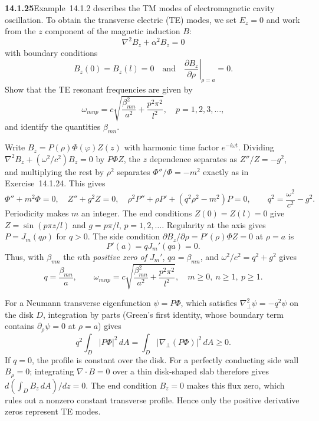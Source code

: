 \par\bigskip
\noindent\textbf{14.1.25}\quad Example~14.1.2 describes the TM modes of
electromagnetic cavity oscillation. To obtain the transverse electric
(TE) modes, we set $E_{z}=0$ and work from the $z$ component of the
magnetic induction $B$:
\[
\nabla^{2}B_{z}+\alpha^{2}B_{z}=0
\]
with boundary conditions
\[
B_{z}(0)=B_{z}(l)=0\quad\text{and}\quad
\left.\frac{\partial B_{z}}{\partial\rho}\right|_{\rho=a}=0.
\]
Show that the TE resonant frequencies are given by
\[
\omega_{mnp}=c\sqrt{\frac{\beta_{mn}^{2}}{a^{2}}+\frac{p^{2}\pi^{2}}{l^{2}}},
\quad p=1,2,3,\ldots,
\]
and identify the quantities $\beta_{mn}$.
\par{}
\par{}
\solution
Write $B_z=P(\rho)\Phi(\varphi)Z(z)$ with harmonic time factor
$e^{-i\omega t}$. Dividing
$\nabla^2B_z+(\omega^2/c^2)B_z=0$ by $P\Phi Z$, the $z$ dependence
separates as $Z''/Z=-g^2$, and multiplying the rest by $\rho^2$
separates $\Phi''/\Phi=-m^2$ exactly as in Exercise~14.1.24. This gives
\[
\Phi''+m^2\Phi=0,\quad Z''+g^2Z=0,\quad
\rho^2P''+\rho P'+(q^2\rho^2-m^2)P=0,
\qquad q^2=\frac{\omega^2}{c^2}-g^2.
\]
Periodicity makes $m$ an integer. The end conditions $Z(0)=Z(l)=0$
give $Z=\sin(p\pi z/l)$ and $g=p\pi/l$, $p=1,2,\ldots$.
Regularity at the axis gives $P=J_m(q\rho)$ for $q>0$. The side
condition $\partial B_z/\partial\rho=P'(\rho)\Phi Z=0$ at $\rho=a$ is
\[
P'(a)=qJ_m'(qa)=0.
\]
Thus, with $\beta_{mn}$ the $n$th \emph{positive zero of $J_m'$},
$qa=\beta_{mn}$, and $\omega^2/c^2=q^2+g^2$ gives
\[
q=\frac{\beta_{mn}}a,\qquad
\boxed{\omega_{mnp}=c\sqrt{\frac{\beta_{mn}^2}{a^2}
+\frac{p^2\pi^2}{l^2}}},\quad m\ge0,\ n\ge1,\ p\ge1.
\]

For a Neumann transverse eigenfunction $\psi=P\Phi$, which satisfies
$\nabla_\perp^2\psi=-q^2\psi$ on the disk $D$, integration by parts
(Green's first identity, whose boundary term contains
$\partial_\rho\psi=0$ at $\rho=a$) gives
\[
q^2\int_D |P\Phi|^2\,dA
=\int_D|\nabla_\perp(P\Phi)|^2\,dA\ge0.
\]
If $q=0$, the profile is constant over the disk. For a perfectly
conducting side wall $B_\rho=0$; integrating $\nabla\cdot B=0$
over a thin disk-shaped slab therefore gives
$d(\int_D B_z\,dA)/dz=0$. The end condition $B_z=0$ makes this
flux zero, which rules out a nonzero constant transverse profile.
Hence only the positive derivative zeros represent TE modes.

